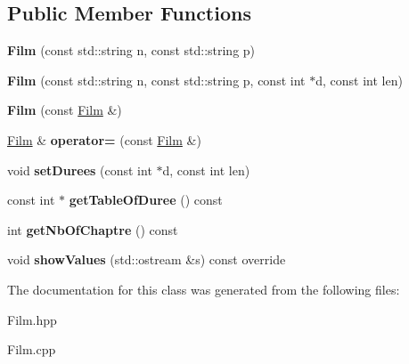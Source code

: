 \subsection*{Public Member Functions}
\begin{DoxyCompactItemize}
\item 
\mbox{\label{class_film_ace3d6cfed074d441f93df060279bd117}} 
{\bfseries Film} (const std\+::string n, const std\+::string p)
\item 
\mbox{\label{class_film_af09f3c16b6b5e00e7847e600105a5793}} 
{\bfseries Film} (const std\+::string n, const std\+::string p, const int $\ast$d, const int len)
\item 
\mbox{\label{class_film_a34c9de2efb9554ce1192e4110d98806b}} 
{\bfseries Film} (const \mbox{\hyperlink{class_film}{Film}} \&)
\item 
\mbox{\label{class_film_a2691ad8cf20210033cc35a6aa28e8553}} 
\mbox{\hyperlink{class_film}{Film}} \& {\bfseries operator=} (const \mbox{\hyperlink{class_film}{Film}} \&)
\item 
\mbox{\label{class_film_a1782dd1d8d226acddfbef980202ba15a}} 
void {\bfseries set\+Durees} (const int $\ast$d, const int len)
\item 
\mbox{\label{class_film_a956cb73ad71f751b8563b2d5f3975f8a}} 
const int $\ast$ {\bfseries get\+Table\+Of\+Duree} () const
\item 
\mbox{\label{class_film_ae6f745cdba7b7b324170c092e0af1625}} 
int {\bfseries get\+Nb\+Of\+Chaptre} () const
\item 
\mbox{\label{class_film_ab47ab06671f39c23924f6df5e6b0c20a}} 
void {\bfseries show\+Values} (std\+::ostream \&s) const override
\end{DoxyCompactItemize}


The documentation for this class was generated from the following files\+:\begin{DoxyCompactItemize}
\item 
Film.\+hpp\item 
Film.\+cpp\end{DoxyCompactItemize}
